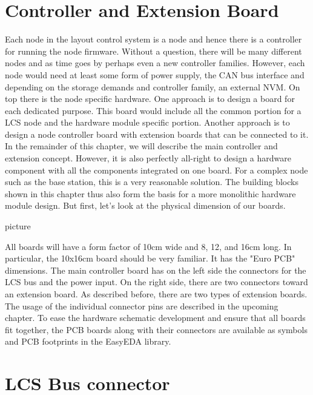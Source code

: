 \section{Controller and Extension Board}

Each node in the layout control system is a node and hence there is a controller for running the node firmware. Without a question, there will be many different nodes and as time goes by perhaps even a new controller families. However, each node would need at least some form of power supply, the CAN bus interface and depending on the storage demands and controller family, an external NVM. On top there is the node specific hardware. One approach is to design a board for each dedicated purpose. This board would include all the common portion for a LCS node and the hardware module specific portion. Another approach is to design a node controller board with extension boards that can be connected to it. In the remainder of this chapter, we will describe the main controller and extension concept. However, it is also perfectly all-right to design a hardware component with all the components integrated on one board. For a complex node such as the base station, this is a very reasonable solution. The building blocks shown in this chapter thus also form the basis for a more monolithic hardware module design. But first, let's look at the physical dimension of our boards.

picture 

All boards will have a form factor of 10cm wide and 8, 12, and 16cm long. In particular, the 10x16cm board should be very familiar. It has the "Euro PCB" dimensions. The main controller board has on the left side the connectors for the LCS bus and the power input. On the right side, there are two connectors toward an extension board. As described before, there are two types of extension boards. The usage of the individual connector pins are described in the upcoming chapter. To ease the hardware schematic development and ensure that all boards fit together, the PCB boards along with their connectors are available as symbols and PCB footprints in the EasyEDA library.

\section{LCS Bus connector}

